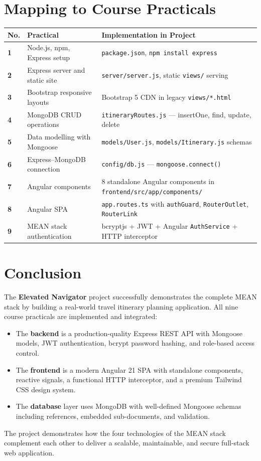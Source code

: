 \documentclass[12pt,a4paper]{article}
\begin{document}
\section{Mapping to Course Practicals}

\begin{longtable}{>{\bfseries}p{1.5cm} p{5.5cm} p{6cm}}
\toprule
No. & Practical & Implementation in Project \\
\midrule
\endhead
1 & Node.js, npm, Express setup & \texttt{package.json}, \texttt{npm install express} \\
2 & Express server and static site & \texttt{server/server.js}, static \texttt{views/} serving \\
3 & Bootstrap responsive layouts & Bootstrap 5 CDN in legacy \texttt{views/*.html} \\
4 & MongoDB CRUD operations & \texttt{itineraryRoutes.js} — insertOne, find, update, delete \\
5 & Data modelling with Mongoose & \texttt{models/User.js}, \texttt{models/Itinerary.js} schemas \\
6 & Express–MongoDB connection & \texttt{config/db.js} — \texttt{mongoose.connect()} \\
7 & Angular components & 8 standalone Angular components in \texttt{frontend/src/app/components/} \\
8 & Angular SPA & \texttt{app.routes.ts} with \texttt{authGuard}, \texttt{RouterOutlet}, \texttt{RouterLink} \\
9 & MEAN stack authentication & bcryptjs + JWT + Angular \texttt{AuthService} + HTTP interceptor \\
\bottomrule
\end{longtable}

\section{Conclusion}

The \textbf{Elevated Navigator} project successfully demonstrates the complete MEAN stack by building a real-world travel itinerary planning application. All nine course practicals are implemented and integrated:

\begin{itemize}
    \item The \textbf{backend} is a production-quality Express REST API with Mongoose models, JWT authentication, bcrypt password hashing, and role-based access control.
    \item The \textbf{frontend} is a modern Angular 21 SPA with standalone components, reactive signals, a functional HTTP interceptor, and a premium Tailwind CSS design system.
    \item The \textbf{database} layer uses MongoDB with well-defined Mongoose schemas including references, embedded sub-documents, and validation.
\end{itemize}

The project demonstrates how the four technologies of the MEAN stack complement each other to deliver a scalable, maintainable, and secure full-stack web application.
\end{document}
